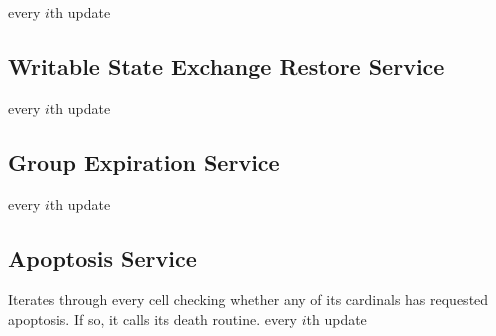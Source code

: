 every $i$th update

\subsection{Writable State Exchange Restore Service}

every $i$th update

\subsection{Group Expiration Service}

every $i$th update

\subsection{Apoptosis Service}

Iterates through every cell checking whether any of its cardinals has requested apoptosis. If so, it calls its death routine.
every $i$th update
